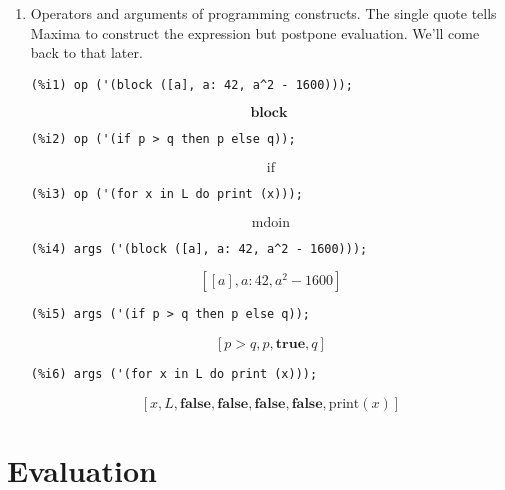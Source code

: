 \documentclass[12pt,leqno]{article}
\begin{document}
\begin{enumerate}
\item Operators and arguments of programming constructs.
The single quote tells Maxima to construct the expression but postpone evaluation.
We'll come back to that later.
\begin{verbatim}
(%i1) op ('(block ([a], a: 42, a^2 - 1600)));
\end{verbatim}
\begin{equation}
\mathbf{block}\;\tag{\%o1}
\label{eq:doc-group1-code11-1-1}
\end{equation}
\begin{verbatim}
(%i2) op ('(if p > q then p else q));
\end{verbatim}
\begin{equation}
\mbox{ if }\tag{\%o2}
\label{eq:doc-group1-code11-2-1}
\end{equation}
\begin{verbatim}
(%i3) op ('(for x in L do print (x)));
\end{verbatim}
\begin{equation}
\mathrm{mdoin}\tag{\%o3}
\label{eq:doc-group1-code11-3-1}
\end{equation}
\begin{verbatim}
(%i4) args ('(block ([a], a: 42, a^2 - 1600)));
\end{verbatim}
\begin{equation}
\left[ \left[ a \right]  , a:42 , a^2-1600 \right] \tag{\%o4}
\label{eq:doc-group1-code11-4-1}
\end{equation}
\begin{verbatim}
(%i5) args ('(if p > q then p else q));
\end{verbatim}
\begin{equation}
\left[ p>q , p , \mathbf{true} , q \right] \tag{\%o5}
\label{eq:doc-group1-code11-5-1}
\end{equation}
\begin{verbatim}
(%i6) args ('(for x in L do print (x)));
\end{verbatim}
\begin{equation}
\left[ x , L , \mathbf{false} , \mathbf{false} , \mathbf{false} , \mathbf{false} , \mathrm{print}\left(x\right) \right] \tag{\%o6}
\label{eq:doc-group1-code11-6-1}
\end{equation}


\end{enumerate}

\section{Evaluation}
\end{document}
